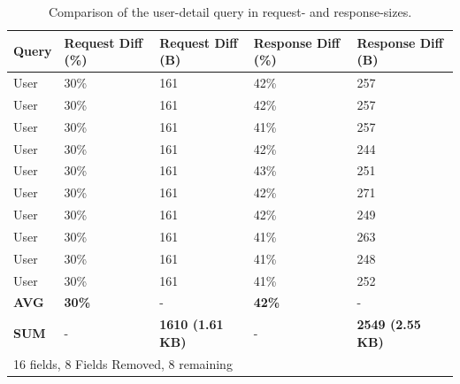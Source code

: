 \documentclass[MSE,Master,english]{twbook}%
\begin{document}
\ifshowTables
\begin{table}[H]
  \begin{tabular}{|l|l|l|l|l|}
  \hline
  Query & Request Diff (\%) & Request Diff (B) & Response Diff (\%) & Response Diff (B) \\
  \hline
  User & 30\% & 161 & 42\% & 257 \\
  \hline
  User & 30\% & 161 & 42\% & 257 \\
  \hline
  User & 30\% & 161 & 41\% & 257 \\
  \hline
  User & 30\% & 161 & 42\% & 244 \\
  \hline
  User & 30\% & 161 & 43\% & 251 \\
  \hline
  User & 30\% & 161 & 42\% & 271 \\
  \hline
  User & 30\% & 161 & 42\% & 249 \\
  \hline
  User & 30\% & 161 & 41\% & 263 \\
  \hline
  User & 30\% & 161 & 41\% & 248 \\
  \hline
  User & 30\% & 161 & 41\% & 252 \\
  \hline
  \hline
  \textbf{AVG} & \textbf{30\%} & - & \textbf{42\%} & -  \\
  \hline
  \textbf{SUM} & - & \textbf{1610 (1.61 KB)} & - & \textbf{2549 (2.55 KB)} \\
  \hline
  \multicolumn{5}{l}{16 fields, 8 Fields Removed, 8 remaining}
  \end{tabular}
  \caption{Comparison of the user-detail query in request- and response-sizes.}\label{table:code:comparison-user-reduction}
\end{table}
\fi

\ifshowUnusedContent
\end{document}
